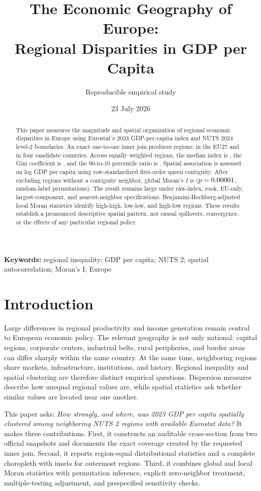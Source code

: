 \documentclass[11pt,a4paper]{article}
\title{\vspace{-1.2cm}\textbf{The Economic Geography of Europe:}\\[0.25em]
\Large Regional Disparities in GDP per Capita}
\author{\normalsize Reproducible empirical study}
\date{\normalsize 23 July 2026}
\begin{document}
\color{ink}
\maketitle
\thispagestyle{fancy}

\begin{abstract}
\noindent
This paper measures the magnitude and spatial organization of regional economic
disparities in Europe using Eurostat's 2023 GDP-per-capita index and NUTS 2024
level-2 boundaries. An exact one-to-one inner join produces \NRegions{} regions:
\NEURegions{} in the EU27 and \NCandidateRegions{} in four candidate countries.
Across equally weighted regions, the median index is \MedianGDP{}, the Gini
coefficient is \GiniGDP{}, and the 90-to-10 percentile ratio is
\PninetyTen{}. Spatial association is assessed on log GDP per capita using
row-standardized first-order queen contiguity. After excluding \QueenIsolates{}
regions without a contiguity neighbor, global Moran's $I$ is \MoranI{}
($p=0.00001{}$, \Permutations{} random-label permutations). The result remains
large under raw-index, rook, EU-only, largest-component, and nearest-neighbor
specifications. Benjamini-Hochberg-adjusted local Moran statistics identify
\LISAHH{} high-high, \LISALL{} low-low, and \LISAHL{} high-low regions. These
results establish a pronounced descriptive spatial pattern, not causal
spillovers, convergence, or the effects of any particular regional policy.
\end{abstract}

\noindent\textbf{Keywords:} regional inequality; GDP per capita; NUTS 2;
spatial autocorrelation; Moran's I; Europe

\section{Introduction}

Large differences in regional productivity and income generation remain central
to European economic policy. The relevant geography is not only national:
capital regions, corporate centers, industrial belts, rural peripheries, and
border areas can differ sharply within the same country. At the same time,
neighboring regions share markets, infrastructure, institutions, and history.
Regional inequality and spatial clustering are therefore distinct empirical
questions. Dispersion measures describe how unequal regional values are, while
spatial statistics ask whether similar values are located near one another.

This paper asks: \emph{How strongly, and where, was 2023 GDP per capita
spatially clustered among neighboring NUTS 2 regions with available Eurostat
data?} It makes three contributions. First, it constructs an auditable
cross-section from two official snapshots and documents the exact coverage
created by the requested inner join. Second, it reports region-equal
distributional statistics and a complete choropleth with insets for outermost
regions. Third, it combines global and local Moran statistics with permutation
inference, explicit zero-neighbor treatment, multiple-testing adjustment, and
prespecified sensitivity checks.
\end{document}
